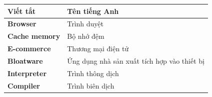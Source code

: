 \documentclass[../DoAn.tex]{subfiles}
\begin{document}
\begin{longtable}{l p{14cm}}
	\hline
   \textbf{Viết tắt}  & \textbf{Tên tiếng Anh} \\ \hline
	\textbf{Browser} & Trình duyệt \\
	\textbf{Cache memory} & Bộ nhớ đệm \\
	\textbf{E-commerce} & Thương mại điện tử \\
	\textbf{Bloatware} & Ứng dụng nhà sản xuất tích hợp vào thiết bị \\
	\textbf{Interpreter}  &  Trình thông dịch \\
    \textbf{Compiler}  &  Trình biên dịch \\

    \hline
\end{longtable}
\end{document}
